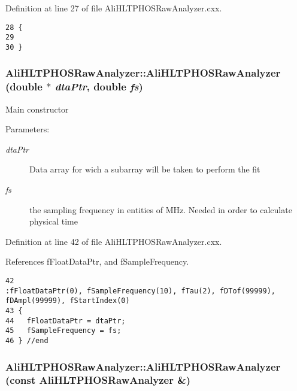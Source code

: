 Definition at line 27 of file Ali\-HLTPHOSRaw\-Analyzer.cxx.

\footnotesize\begin{verbatim}28 {
29 
30 }
\end{verbatim}\normalsize 


\subsubsection{\setlength{\rightskip}{0pt plus 5cm}Ali\-HLTPHOSRaw\-Analyzer::Ali\-HLTPHOSRaw\-Analyzer (double $\ast$ {\em dta\-Ptr}, double {\em fs})}\label{classAliHLTPHOSRawAnalyzer_a2}


Main constructor \begin{Desc}
\item[Parameters:]
\begin{description}
\item[{\em dta\-Ptr}]Data array for wich a subarray will be taken to perform the fit \item[{\em fs}]the sampling frequency in entities of MHz. Needed in order to calculate physical time \end{description}
\end{Desc}


Definition at line 42 of file Ali\-HLTPHOSRaw\-Analyzer.cxx.

References f\-Float\-Data\-Ptr, and f\-Sample\-Frequency.

\footnotesize\begin{verbatim}42                                                                      :fFloatDataPtr(0), fSampleFrequency(10), fTau(2), fDTof(99999), fDAmpl(99999), fStartIndex(0)
43 {
44   fFloatDataPtr = dtaPtr;  
45   fSampleFrequency = fs;
46 } //end  
\end{verbatim}\normalsize 


\subsubsection{\setlength{\rightskip}{0pt plus 5cm}Ali\-HLTPHOSRaw\-Analyzer::Ali\-HLTPHOSRaw\-Analyzer (const {\bf Ali\-HLTPHOSRaw\-Analyzer} \&)}\label{classAliHLTPHOSRawAnalyzer_a3}




